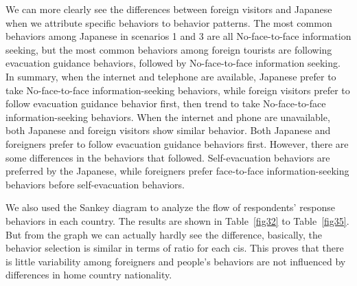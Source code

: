 We can more clearly see the differences between foreign visitors and Japanese when we attribute specific behaviors to behavior patterns. The most common behaviors among Japanese in scenarios 1 and 3 are all No-face-to-face information seeking, but the most common behaviors among foreign tourists are following evacuation guidance behaviors, followed by No-face-to-face information seeking. In summary, when the internet and telephone are available, Japanese prefer to take No-face-to-face information-seeking behaviors, while foreign visitors prefer to follow evacuation guidance behavior first, then trend to take No-face-to-face information-seeking behaviors. When the internet and phone are unavailable, both Japanese and foreign visitors show similar behavior. Both Japanese and foreigners prefer to follow evacuation guidance behaviors first. However, there are some differences in the behaviors that followed. Self-evacuation behaviors are preferred by the Japanese, while foreigners prefer face-to-face information-seeking behaviors before self-evacuation behaviors.


We also used the Sankey diagram to analyze the flow of respondents' response behaviors in each country. The results are shown in Table~\ref{fig32} to Table~\ref{fig35}. But from the graph we can actually hardly see the difference, basically, the behavior selection is similar in terms of ratio for each cis. This proves that there is little variability among foreigners and people's behaviors are not influenced by differences in home country nationality.



